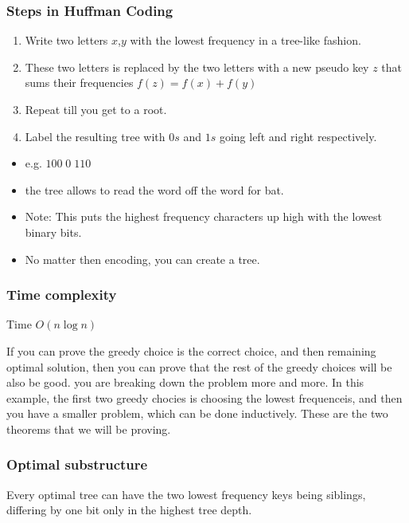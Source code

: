 \subsubsection{Steps in Huffman Coding}
\begin{process}
    \begin{enumerate}
        \item Write two letters $x$,$y$ with the lowest frequency in a tree-like fashion.
        \item These two letters is replaced by the two letters with a new pseudo key $z$ that sums their frequencies $f(z)=f(x)+f(y)$
        \item Repeat till you get to a root. 
        \item Label the resulting tree with $0s$ and $1s$ going left and right respectively.
    \end{enumerate}
    \begin{itemize}
        \item e.g. $100 \; 0 \; 110$
        \item the tree allows to read the word off the word for bat. 
        \item Note: This puts the highest frequency characters up high with the lowest binary bits. 
        \item No matter then encoding, you can create a tree. 
    \end{itemize}

\end{process}

\subsubsection{Time complexity}
\begin{definition}
    Time $O(n \log n)$
\end{definition}

\begin{intuition}
    If you can prove the greedy choice is the correct choice, and then remaining optimal solution, then you can prove that the rest of the greedy choices will be also be good. you are breaking down the problem more and more. In this example, the first two greedy chocies is choosing the lowest frequenceis, and then you have a smaller problem, which can be done inductively. These are the two theorems that we will be proving. 
\end{intuition}

\subsubsection{Optimal substructure}
\begin{theorem}
Every optimal tree can have the two lowest frequency keys being siblings, differing by one bit only in the highest tree depth. 

\end{theorem}

